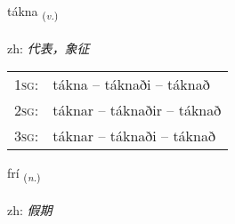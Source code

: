 \documentclass[frontgrid, backgrid]{flacards}\usepackage[]{graphicx}\usepackage[]{color}
\begin{document}
\renewcommand{\blhead}{\vskip5pt {\small\bfseries\footnotesize Sagnorð | 动词 }}
\renewcommand{\bcfoot}{\vskip5pt \hspace{2pt}{\small\bfseries\footnotesize 2K}}


{tákna \small{\textsubscript{(\textit{v.})}} \\[1ex] %
\textphonetic{[tʰauhkna]} \\
zh: \emph{代表，象征} \\  [2ex]
\renewcommand*{\arraystretch}{0.8}
\begin{tabular}{p{1cm}l}
\textsc{1sg}: & tákna -- táknaði -- táknað \\ 
\textsc{2sg}: & táknar -- táknaðir -- táknað \\ 
\textsc{3sg}: & táknar -- táknaði -- táknað \\ 
\end{tabular}
}

\renewcommand{\flhead}{\vskip5pt \fboxsep=0pt {\small\bfseries\footnotesize Nafnorð | 名词}}
\renewcommand{\fcfoot}{\vskip5pt \fboxsep=0pt \hspace{2pt}{\small\bfseries\footnotesize 2K}}

\renewcommand{\blhead}{\vskip5pt {\small\bfseries\footnotesize Nafnorð | 名词 }}
\renewcommand{\bcfoot}{\vskip5pt \hspace{2pt}{\small\bfseries\footnotesize 2K}}


{frí \small{\textsubscript{(\textit{n.})}} \\[1ex] %
\textphonetic{[friː]} \\
zh: \emph{假期} \\  [2ex]
\renewcommand*{\arraystretch}{0.8}
}

\renewcommand{\flhead}{\vskip5pt \fboxsep=0pt {\small\bfseries\footnotesize Sagnorð | 动词}}
\renewcommand{\fcfoot}{\vskip5pt \fboxsep=0pt \hspace{2pt}{\small\bfseries\footnotesize 2K}}
\end{document}
